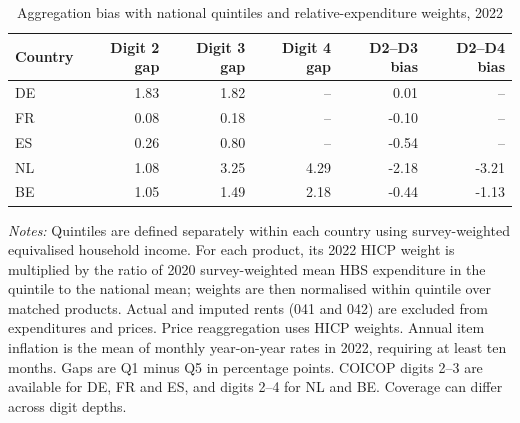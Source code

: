 \begin{table}[!htbp]

\caption{\label{tab:individual-distribution-aggregation-bias-2022-excluding-rents}Aggregation bias with national quintiles and relative-expenditure weights, 2022}
\centering
\begin{tabular}[t]{lrrrrr}
\toprule
Country & Digit 2 gap & Digit 3 gap & Digit 4 gap & D2--D3 bias & D2--D4 bias\\
\midrule
DE & 1.83 & 1.82 & -- & 0.01 & --\\
FR & 0.08 & 0.18 & -- & -0.10 & --\\
ES & 0.26 & 0.80 & -- & -0.54 & --\\
NL & 1.08 & 3.25 & 4.29 & -2.18 & -3.21\\
BE & 1.05 & 1.49 & 2.18 & -0.44 & -1.13\\
\bottomrule
\end{tabular}

\begin{flushleft}
\footnotesize{\emph{Notes:} Quintiles are defined separately within each country using survey-weighted equivalised household income. For each product, its 2022 HICP weight is multiplied by the ratio of 2020 survey-weighted mean HBS expenditure in the quintile to the national mean; weights are then normalised within quintile over matched products. Actual and imputed rents (041 and 042) are excluded from expenditures and prices. Price reaggregation uses HICP weights. Annual item inflation is the mean of monthly year-on-year rates in 2022, requiring at least ten months. Gaps are Q1 minus Q5 in percentage points. COICOP digits 2--3 are available for DE, FR and ES, and digits 2--4 for NL and BE. Coverage can differ across digit depths.}
\end{flushleft}
\end{table}
